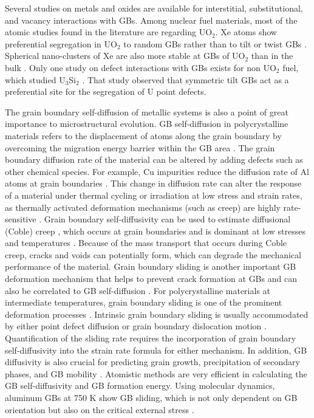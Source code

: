 \documentclass[review]{elsarticle}
\begin{document}
Several studies on metals and oxides are available for interstitial, substitutional, and vacancy interactions with GBs. Among nuclear fuel materials, most of the atomic studies found in the literature are regarding UO$_\mathrm{2}$. Xe atoms show preferential segregation in UO$_\mathrm{2}$ to random GBs rather than to tilt or twist GBs \cite{PhysRevB.84.174105_Xe_UO2, met12050763_Xe_Uo2}. Spherical nano-clusters of Xe are also more stable at GBs of UO$_\mathrm{2}$ than in the bulk \cite{PhysRevB.81.174111_Xe_UO2_clus}. Only one study on defect interactions with GBs exists for non UO$_\mathrm{2}$ fuel, which studied U$_\mathrm{3}$Si$_\mathrm{2}$ \cite{beelerUSi}. That study observed that symmetric tilt GBs act as a preferential site for the segregation of U point defects. 

\par The grain boundary self-diffusion of metallic systems is also a point of great importance to microstructural evolution. GB self-diffusion in polycrystalline materials refers to the displacement of atoms along the grain boundary by overcoming the migration energy barrier within the GB area \cite{lipnitskii2011}. The grain boundary diffusion rate of the material can be altered by adding defects such as other chemical species. For example, Cu impurities reduce the diffusion rate of Al atoms at grain boundaries \cite{balluffi1996}. This change in diffusion rate can alter the response of a material under thermal cycling or irradiation at low stress and strain rates, as thermally activated deformation mechanisms (such as creep) are highly rate-sensitive \cite{calhoun}. Grain boundary self-diffusivity can be used to estimate diffusional (Coble) creep \cite{MCFADDEN202066_creep}, which occurs at grain boundaries and is dominant at low stresses and temperatures \cite{Nabarro,coble,1970_langdon}. Because of the mass transport that occurs during Coble creep, cracks and voids can potentially form, which can degrade the mechanical performance of the material. Grain boundary sliding is another important GB deformation mechanism that helps to prevent crack formation at GBs and can also be correlated to GB self-diffusion \cite{MISHIN_gb_diff}. For polycrystalline materials at intermediate temperatures, grain boundary sliding is one of the prominent deformation processes \cite{GB_deformation}. Intrinsic grain boundary sliding is usually accommodated by either point defect diffusion \cite{GB_deformation} or grain boundary dislocation motion \cite{GATES197455}. Quantification of the sliding rate requires the incorporation of grain boundary self-diffusivity into the strain rate formula for either mechanism. In addition, GB diffusivity is also crucial for predicting grain growth, precipitation of secondary phases, and GB mobility \cite{MISHIN_gb_diff, GB_deformation}. Atomistic methods are very efficient in calculating the GB self-diffusivity and GB formation energy\cite{calhoun}. Using molecular dynamics, aluminum GBs at 750 K show GB sliding, which is not only dependent on GB orientation but also on the critical external stress \cite{MD_GBS}. 
\end{document}
